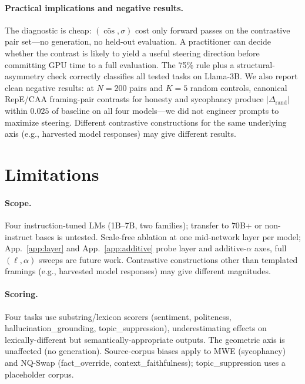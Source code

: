 \documentclass[11pt]{article}
\begin{document}
\paragraph{Practical implications and negative results.}
The diagnostic is cheap: $(\bar{\cos}, \sigma)$ cost only forward
passes on the contrastive pair set---no generation, no held-out
evaluation. A practitioner can decide whether the contrast is
likely to yield a useful steering direction before committing GPU
time to a full evaluation. The 75\% rule plus a structural-asymmetry
check correctly classifies all tested tasks on Llama-3B. We also
report clean negative results: at $N{=}200$ pairs and $K{=}5$ random
controls, canonical RepE/CAA framing-pair contrasts for honesty and
sycophancy produce $|\Delta_{\text{rand}}|$ within $0.025$ of
baseline on all four models---we did not engineer prompts to maximize
steering. Different contrastive constructions for the same underlying
axis (e.g., harvested model responses) may give different results.

\section{Limitations}

\paragraph{Scope.} Four instruction-tuned LMs (1B--7B, two
families); transfer to $70$B+ or non-instruct bases is untested.
Scale-free ablation at one mid-network layer per model;
App.~\ref{app:layer} and App.~\ref{app:additive} probe layer and
additive-$\alpha$ axes, full $(\ell, \alpha)$ sweeps are future
work. Contrastive constructions other than templated framings
(e.g., harvested model responses) may give different magnitudes.

\paragraph{Scoring.} Four tasks use substring/lexicon scorers
(sentiment, politeness, hallucination\_grounding, topic\_suppression),
underestimating effects on lexically-different but
semantically-appropriate outputs. The geometric axis is unaffected
(no generation). Source-corpus biases apply to MWE (sycophancy) and
NQ-Swap (fact\_override, context\_faithfulness); topic\_suppression
uses a placeholder corpus.
\end{document}
